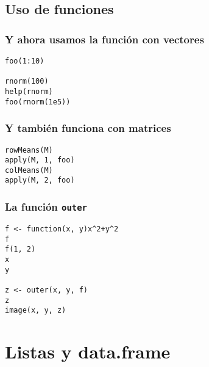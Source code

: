 \documentclass[xcolor={usenames,svgnames,dvipsnames}]{beamer}
\begin{document}
\subsection{Uso de funciones}
\label{sec-3-2}
\begin{frame}[fragile]
\frametitle{Y ahora usamos la función con vectores}
\label{sec-3-2-1}


\lstset{language=R}
\begin{lstlisting}
foo(1:10)

rnorm(100)
help(rnorm)
foo(rnorm(1e5))
\end{lstlisting}
\end{frame}
\begin{frame}[fragile]
\frametitle{Y también funciona con matrices}
\label{sec-3-2-2}


\lstset{language=R}
\begin{lstlisting}
rowMeans(M)
apply(M, 1, foo)
colMeans(M)
apply(M, 2, foo)
\end{lstlisting}
\end{frame}
\begin{frame}[fragile]
\frametitle{La función \texttt{outer}}
\label{sec-3-2-3}


\lstset{language=R}
\begin{lstlisting}
f <- function(x, y)x^2+y^2
f
f(1, 2)
x
y

z <- outer(x, y, f)
z
image(x, y, z)
\end{lstlisting}
\end{frame}
\section{Listas y data.frame}
\label{sec-4}
\end{document}
